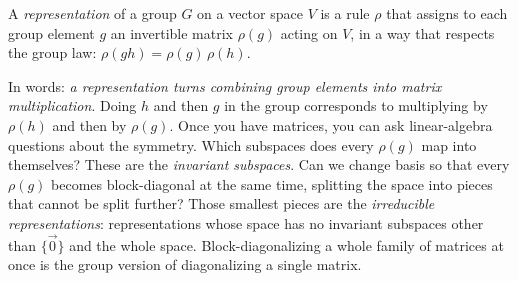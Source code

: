 \begin{definition}[Representation]
\label{ch37:def-rep}
A \emph{representation} of a group $G$ on a vector space $V$ is a rule
$\rho$ that assigns to each group element $g$ an invertible matrix $\rho(g)$ acting
on $V$, in a way that respects the group law:
$\rho(g h) = \rho(g)\,\rho(h)$.
\end{definition}

In words: \emph{a representation turns combining group elements into matrix
multiplication}. Doing $h$ and then $g$ in the group corresponds to multiplying by
$\rho(h)$ and then by $\rho(g)$.
Once you have matrices, you can ask linear-algebra questions about the
symmetry. Which subspaces does every $\rho(g)$ map into themselves? These are the
\emph{invariant subspaces}. Can we change basis so that every $\rho(g)$ becomes
block-diagonal at the same time, splitting the space into pieces that cannot be
split further? Those smallest pieces are the \emph{irreducible representations}:
representations whose space has no invariant subspaces other than $\{\vec{0}\}$ and
the whole space. Block-diagonalizing a whole family of matrices at once is the
group version of diagonalizing a single matrix.

